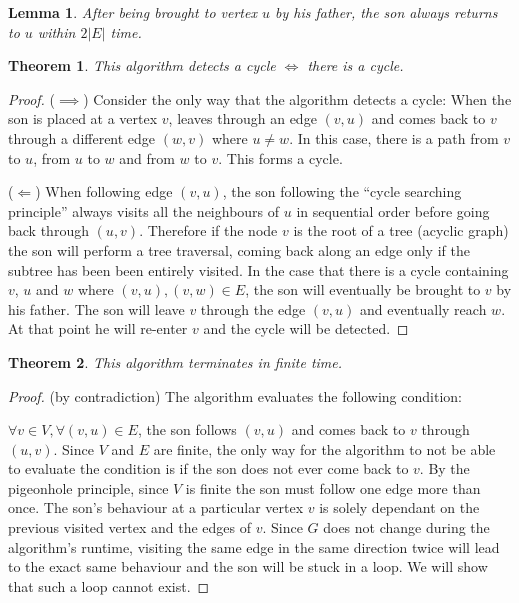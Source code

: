 \documentclass{article}
\newtheorem{theorem}{Theorem}
\newtheorem{lemma}{Lemma}
\begin{document}
\begin{enumerate}
\begin{lemma}After being brought to vertex $u$ by his father, the son always returns to $u$ within $2|E|$ time.
\end{lemma}

\begin{theorem}This algorithm detects a cycle $\iff$ there is a cycle.\end{theorem}
\begin{proof}
($\implies$) Consider the only way that the algorithm detects a cycle: When the son is placed at a vertex $v$, leaves through an edge $(v,u)$ and comes back to $v$ through a different edge $(w,v)$ where $u\not=w$. In this case, there is a path from $v$ to $u$, from $u$ to $w$ and from $w$ to $v$. This forms a cycle.

($\Longleftarrow$) When following edge $(v,u)$, the son following the ``cycle searching principle'' always visits all the neighbours of $u$ in sequential order before going back through $(u,v)$. Therefore if the node $v$ is the root of a tree (acyclic graph) the son will perform a tree traversal, coming back along an edge only if the subtree has been been entirely visited. In the case that there is a cycle containing $v$, $u$ and $w$ where $(v,u),(v,w)\in E$, the son will eventually be brought to $v$ by his father. The son will leave $v$ through the edge $(v,u)$ and eventually reach $w$. At that point he will re-enter $v$ and the cycle will be detected.
\end{proof}
\begin{theorem}This algorithm terminates in finite time.\end{theorem}
\begin{proof} (by contradiction) The algorithm evaluates the following condition:

$\forall v\in V, \forall (v,u)\in E$, the son follows $(v,u)$ and comes back to $v$ through $(u,v)$. Since $V$ and $E$ are finite, the only way for the algorithm to not be able to evaluate the condition is if the son does not ever come back to $v$. By the pigeonhole principle, since $V$ is finite the son must follow one edge more than once. The son's behaviour at a particular vertex $v$ is solely dependant on the previous visited vertex and the edges of $v$. Since $G$ does not change during the algorithm's runtime, visiting the same edge in the same direction twice will lead to the exact same behaviour and the son will be stuck in a loop. We will show that such a loop cannot exist.


\end{proof}
\end{enumerate}
\end{document}
